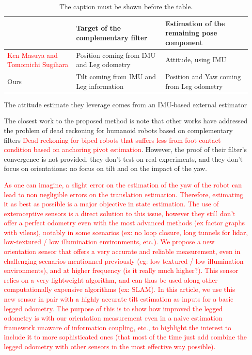 \documentclass{IJCAS}
\begin{document}
\begin{table}[!b] 
    \vskip -0.75pc
    \setlength{\extrarowheight}{0.5ex}
    \setlength{\tabcolsep}{1pt}
    \caption{The caption must be shown before the table.}\label{tab:1}
    \begin{center}
    \vskip -1.25pc
    {\footnotesize
    \begin{tabu}to\linewidth{|X[c]|X[c]|X[c]|} 
        \hline 
        & Target of the complementary filter & Estimation of the remaining pose component  \\ \hline 
        \textcolor{red}{Ken Masuya and Tomomichi Sugihara} & Position coming from IMU and Leg odometry & Attitude, using IMU   \\ \hline 
        Ours & Tilt coming from IMU and Leg information &  Position and Yaw coming from Leg odometry  \\ \hline 
    \end{tabu}
    }
    \end{center}
    \vskip -0.25pc
\end{table}

The attitude estimate they leverage comes from an IMU-based external estimator

The closest work to the proposed method is  note that other works have addressed the problem of dead reckoning for humanoid robots based on complementary filters \textcolor{red}{Dead reckoning for biped robots that suffers less from foot contact condition based on anchoring pivot estimation}. However, the proof of their filter's convergence is not provided, they don't test on real experiments, and they don't focus on orientations: no focus on tilt and on the impact of the yaw.


\textcolor{red}{
As one can imagine, a slight error on the estimation of the yaw of the robot can lead to non negligible errors on the translation estimation. Therefore, estimating it as best as possible is a major objective in state estimation. The use of exteroceptive sensors is a direct solution to this issue, however they still don't offer a perfect odometry even with the most advanced methods (ex factor graphs with vilens), notably in some scenarios (ex: no loop closure, long tunnels for lidar, low-textured / low illumination environments, etc.). We propose a new orientation sensor that offers a very accurate and reliable measurement, even in challenging scenarios mentionned previously (eg: low-textured / low illumination environments), and at higher frequency (is it really much higher?). This sensor relies on a very lightweight algorithm, and can thus be used along other computationally expensive algorithms (ex: SLAM). In this article, we use this new sensor in pair with a highly accurate tilt estimation as inputs for a basic legged odometry. The purpose of this is to show how improved the legged odometry is with our orientation measurement even in a naive estimation framework unaware of information coupling, etc., to highlight the interest to include it  to more sophisticated ones (that most of the time just add combine the legged odometry with other sensors in the most effective way possible).}
    
\end{document}
